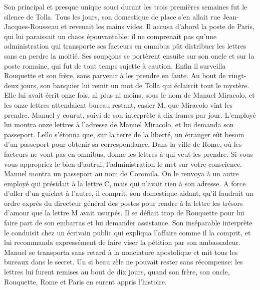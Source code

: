 Son principal et presque unique souci durant les trois premières semaines fut le silence de Tolla. Tous les jours, son domestique de place s'en allait rue Jean-Jacques-Rousseau et revenait les mains vides. Il accusa d'abord la poste de Paris, qui lui paraissait un chaos épouvantable: il ne comprenait pas qu'une administration qui transporte ses facteurs en omnibus pût distribuer les lettres sans en perdre la moitié. Ses soupçons se portèrent ensuite sur son oncle et sur la poste romaine, qui fut de tout temps sujette à caution. Enfin il surveilla Rouquette et son frère, sans parvenir à les prendre en faute. Au bout de vingt-deux jours, son banquier lui remit un mot de Tolla qui éclaircit tout le mystère. Elle lui avait écrit onze fois, ni plus ni moins, sous le nom de Manuel Miracolo, et les onze lettres attendaient bureau restant, casier M, que Miracolo vînt les prendre. Manuel y courut, suivi de son interprète à dix francs par jour. L'employé lui montra onze lettres à l'adresse de Manuel Miracolo, et lui demanda son passeport. Lello s'étonna que, sur la terre de la liberté, un étranger eût besoin d'un passeport pour obtenir sa correspondance. Dans la ville de Rome, où les facteurs ne vont pas en omnibus, donne les lettres à qui veut les prendre. Si vous vous appropriez le bien d'autrui, l'administration le met sur votre conscience. Manuel montra un passeport au nom de Coromila. On le renvoya à un autre employé qui présidait à la lettre C, mais qui n'avait rien à son adresse. A force d'aller d'un guichet à l'autre, il comprit, son domestique aidant, qu'il faudrait un ordre exprès du directeur général des postes pour rendre à la lettre les trésors d'amour que la lettre M avait usurpés. Il se défiait trop de Rouquette pour lui faire part de son embarras et lui demander assistance. Son inséparable interprète le conduisit chez un écrivain public qui expliqua l'affaire comme il la comprit, et lui recommanda expressément de faire viser la pétition par son ambassadeur. Manuel se transporta sans retard à la nonciature apostolique et mit tous les bureaux dans le secret. Un si beau zèle ne pouvait rester sans récompense: les lettres lui furent remises au bout de dix jours, quand son frère, son oncle, Rouquette, Rome et Paris en eurent appris l'histoire.

